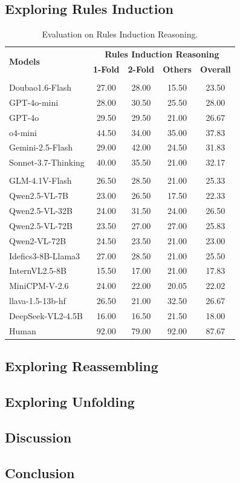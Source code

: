 \documentclass[letterpaper]{article} %
\begin{document}
\subsection{Exploring Rules Induction}


\begin{table}[b]
\centering
\begin{tabular}{l|cccc}
\toprule
\multirow{2}{*}{\textbf{Models}} & \multicolumn{4}{c}{\textbf{Rules Induction Reasoning}} \\
 & \textbf{1-Fold} & \textbf{2-Fold} & \textbf{Others} & \textbf{Overall} \\
\midrule
\rowcolor{yellow!20}\multicolumn{5}{l}{\textbf{\textit{Proprietary}}} \\
Doubao1.6-Flash &27.00 &28.00 &15.50 &23.50 \\
GPT-4o-mini &28.00 &30.50&25.50 &28.00 \\
GPT-4o & 29.50&29.50 & 21.00&26.67 \\
o4-mini & \cellcolor{gray!30}44.50&34.00 & \cellcolor{gray!30}35.00&\cellcolor{gray!30}37.83 \\
Gemini-2.5-Flash &29.00 &\cellcolor{gray!30}42.00 &24.50 &31.83 \\
Sonnet-3.7-Thinking &40.00 &35.50 & 21.00& 32.17\\
\midrule
\rowcolor{yellow!20}\multicolumn{5}{l}{\textbf{\textit{Open-source}}} \\
GLM-4.1V-Flash & 26.50& 28.50& 21.00&25.33 \\
Qwen2.5-VL-7B &23.00 &26.50 &17.50 & 22.33\\
Qwen2.5-VL-32B &24.00&31.50&24.00&26.50\\
Qwen2.5-VL-72B &23.50 &27.00 &27.00 & 25.83\\
Qwen2-VL-72B &24.50 &23.50 &21.00 &23.00 \\
Idefics3-8B-Llama3 &27.00 &28.50 & 21.00&25.50 \\
InternVL2.5-8B & 15.50& 17.00&21.00 & 17.83\\
MiniCPM-V-2.6 & 24.00& 22.00& 20.05& 22.02\\
llava-1.5-13b-hf &26.50&21.00&32.50&26.67\\
DeepSeek-VL2-4.5B & 16.00 &16.50 &21.50&18.00\\
\midrule
Human&92.00&79.00&92.00&87.67\\
\bottomrule
\end{tabular}
\caption{Evaluation on Rules Induction Reasoning.}
\label{tab:rules induction}
\end{table}









\subsection{Exploring Reassembling}
\subsection{Exploring Unfolding}

\subsection{Discussion}
\subsection{Conclusion}


\end{document}

